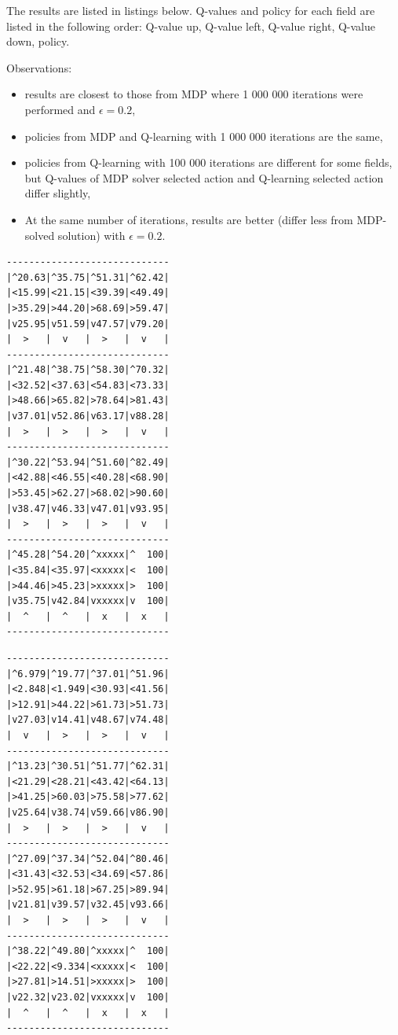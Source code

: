 \documentclass[12pt,a4paper]{article} %
\begin{document}
The results are listed in listings below. Q-values and policy for each field are listed in the following order: Q-value up, Q-value left, Q-value right, Q-value down, policy. 

Observations:
\begin{itemize}
\item results are closest to those from MDP where 1 000 000 iterations were performed and $\epsilon=0.2$,
\item policies from MDP and Q-learning with 1 000 000 iterations are the same,
\item policies from Q-learning with 100 000 iterations are different for some fields, but Q-values of MDP solver selected action and Q-learning selected action differ slightly,
\item At the same number of iterations, results are better (differ less from MDP-solved solution) with $\epsilon=0.2$.
\end{itemize}


\begin{lstlisting}[float,floatplacement=H,caption={Q-learning: 10 000 iterations, $\epsilon$: 0.2}]
-----------------------------
|^20.63|^35.75|^51.31|^62.42|
|<15.99|<21.15|<39.39|<49.49|
|>35.29|>44.20|>68.69|>59.47|
|v25.95|v51.59|v47.57|v79.20|
|  >   |  v   |  >   |  v   |
-----------------------------
|^21.48|^38.75|^58.30|^70.32|
|<32.52|<37.63|<54.83|<73.33|
|>48.66|>65.82|>78.64|>81.43|
|v37.01|v52.86|v63.17|v88.28|
|  >   |  >   |  >   |  v   |
-----------------------------
|^30.22|^53.94|^51.60|^82.49|
|<42.88|<46.55|<40.28|<68.90|
|>53.45|>62.27|>68.02|>90.60|
|v38.47|v46.33|v47.01|v93.95|
|  >   |  >   |  >   |  v   |
-----------------------------
|^45.28|^54.20|^xxxxx|^  100|
|<35.84|<35.97|<xxxxx|<  100|
|>44.46|>45.23|>xxxxx|>  100|
|v35.75|v42.84|vxxxxx|v  100|
|  ^   |  ^   |  x   |  x   |
-----------------------------
\end{lstlisting}

\begin{lstlisting}[float,floatplacement=H,caption={Q-learning: 10 000 iterations, $\epsilon$: 0.05}]
-----------------------------
|^6.979|^19.77|^37.01|^51.96|
|<2.848|<1.949|<30.93|<41.56|
|>12.91|>44.22|>61.73|>51.73|
|v27.03|v14.41|v48.67|v74.48|
|  v   |  >   |  >   |  v   |
-----------------------------
|^13.23|^30.51|^51.77|^62.31|
|<21.29|<28.21|<43.42|<64.13|
|>41.25|>60.03|>75.58|>77.62|
|v25.64|v38.74|v59.66|v86.90|
|  >   |  >   |  >   |  v   |
-----------------------------
|^27.09|^37.34|^52.04|^80.46|
|<31.43|<32.53|<34.69|<57.86|
|>52.95|>61.18|>67.25|>89.94|
|v21.81|v39.57|v32.45|v93.66|
|  >   |  >   |  >   |  v   |
-----------------------------
|^38.22|^49.80|^xxxxx|^  100|
|<22.22|<9.334|<xxxxx|<  100|
|>27.81|>14.51|>xxxxx|>  100|
|v22.32|v23.02|vxxxxx|v  100|
|  ^   |  ^   |  x   |  x   |
-----------------------------
\end{lstlisting}
\end{document}
